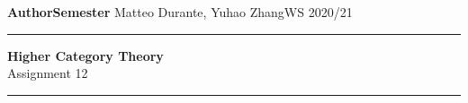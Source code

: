 \documentclass[a4paper,11pt,openany]{scrartcl}
\begin{document}
\noindent\textbf{Author}\hfill\textbf{Semester} \linebreak
\vspace*{-.1cm} Matteo Durante, Yuhao Zhang\hfill WS 2020/21 \\

\noindent
\rule{\linewidth}{1pt}
\begin{center}
\Large
\textbf{Higher Category Theory} \\
Assignment 12
\end{center}
\rule{\linewidth}{1pt}
\\


\newcommand{\La}{\Lambda}
\newcommand{\pa}{\partial}
\newcommand{\ob}{\operatorname{Ob}}
\newcommand{\mor}{\operatorname{Mor}}
\newcommand{\sto}{\twoheadrightarrow}

\newcommand{\plim}{\varprojlim}
\newcommand{\sst}{\subseteq}
\newcommand{\eq}{\operatorname{eq}}

\newcommand{\f}{\varphi}

\newcommand{\sing}{\operatorname{Sing}}

\newcommand{\ihom}{\underline{\Hom}}

\newcommand{\N}{\mathbb{N}}
\end{document}
